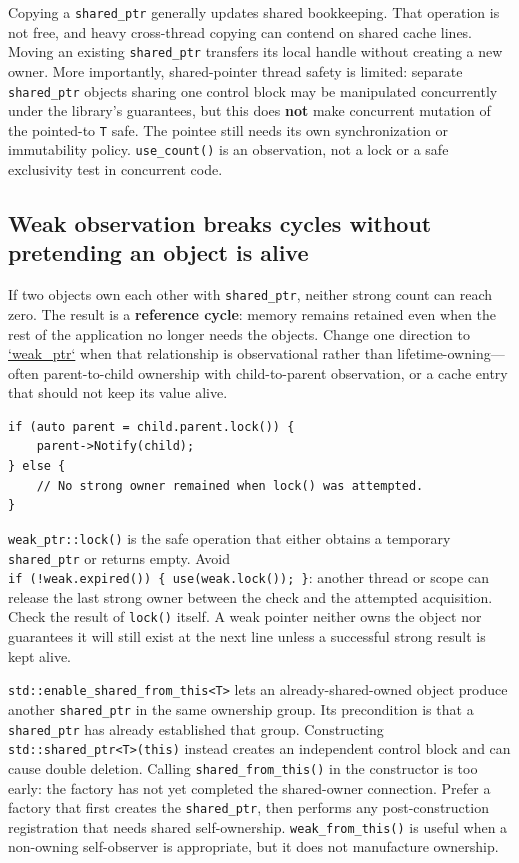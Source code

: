 Copying a \texttt{shared\_ptr} generally updates shared bookkeeping. That operation is not free, and heavy cross-thread copying can contend on shared cache lines. Moving an existing \texttt{shared\_ptr} transfers its local handle without creating a new owner. More importantly, shared-pointer thread safety is limited: separate \texttt{shared\_ptr} objects sharing one control block may be manipulated concurrently under the library's guarantees, but this does \textbf{not} make concurrent mutation of the pointed-to \texttt{T} safe. The pointee still needs its own synchronization or immutability policy. \texttt{use\_count()} is an observation, not a lock or a safe exclusivity test in concurrent code.

\subsection{Weak observation breaks cycles without pretending an object is alive}\label{01-foundations-i-ch004-weak-observation-breaks-cycles-without-pretending-an-object-is-alive}

If two objects own each other with \texttt{shared\_ptr}, neither strong count can reach zero. The result is a \textbf{reference cycle}: memory remains retained even when the rest of the application no longer needs the objects. Change one direction to \hyperref[appendix-b9548675eb2b]{`weak\_ptr`} when that relationship is observational rather than lifetime-owning---often parent-to-child ownership with child-to-parent observation, or a cache entry that should not keep its value alive.

\begin{verbatim}
if (auto parent = child.parent.lock()) {
    parent->Notify(child);
} else {
    // No strong owner remained when lock() was attempted.
}
\end{verbatim}

\texttt{weak\_ptr::lock()} is the safe operation that either obtains a temporary \texttt{shared\_ptr} or returns empty. Avoid \texttt{if\ (!weak.expired())\ \{\ use(weak.lock());\ \}}: another thread or scope can release the last strong owner between the check and the attempted acquisition. Check the result of \texttt{lock()} itself. A weak pointer neither owns the object nor guarantees it will still exist at the next line unless a successful strong result is kept alive.

\texttt{std::enable\_shared\_from\_this\textless{}T\textgreater{}} lets an already-shared-owned object produce another \texttt{shared\_ptr} in the same ownership group. Its precondition is that a \texttt{shared\_ptr} has already established that group. Constructing \texttt{std::shared\_ptr\textless{}T\textgreater{}(this)} instead creates an independent control block and can cause double deletion. Calling \texttt{shared\_from\_this()} in the constructor is too early: the factory has not yet completed the shared-owner connection. Prefer a factory that first creates the \texttt{shared\_ptr}, then performs any post-construction registration that needs shared self-ownership. \texttt{weak\_from\_this()} is useful when a non-owning self-observer is appropriate, but it does not manufacture ownership.

